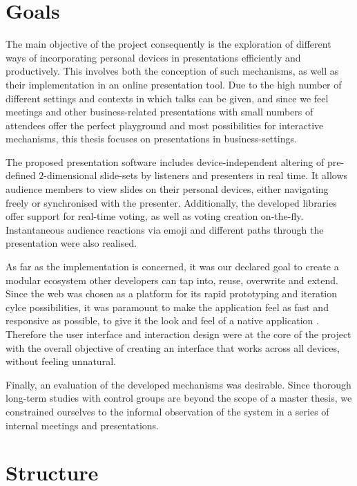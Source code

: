 \section{Goals}

The main objective of the project consequently is the exploration of different ways of incorporating personal devices in presentations efficiently and productively. This involves both the conception of such mechanisms, as well as their implementation in an online presentation tool.
Due to the high number of different settings and contexts in which talks can be given, and since we feel meetings and other business-related presentations with small numbers of attendees offer the perfect playground and most possibilities for interactive mechanisms, this thesis focuses on presentations in business-settings.

The proposed presentation software includes device-independent altering of pre-defined $2$-dimensional slide-sets by listeners and presenters in real time. It allows audience members to view slides on their personal devices, either navigating freely or synchronised with the presenter. Additionally, the developed libraries offer support for real-time voting, as well as voting creation on-the-fly. Instantaneous audience reactions via emoji and different paths through the presentation were also realised.

As far as the implementation is concerned, it was our declared goal to create a modular ecosystem other developers can tap into, reuse, overwrite and extend. Since the web was chosen as a platform for its rapid prototyping and iteration cylce possibilities, it was paramount to make the application feel as fast and responsive as possible, to give it the look and feel of a native application \cite{Charland:WebVsNative}. Therefore the user interface and interaction design were at the core of the project with the overall objective of creating an interface that works across all devices, without feeling unnatural.

Finally, an evaluation of the developed mechanisms was desirable. Since thorough long-term studies with control groups are beyond the scope of a master thesis, we constrained ourselves to the informal observation of the system in a series of internal meetings and presentations.

\section{Structure}

